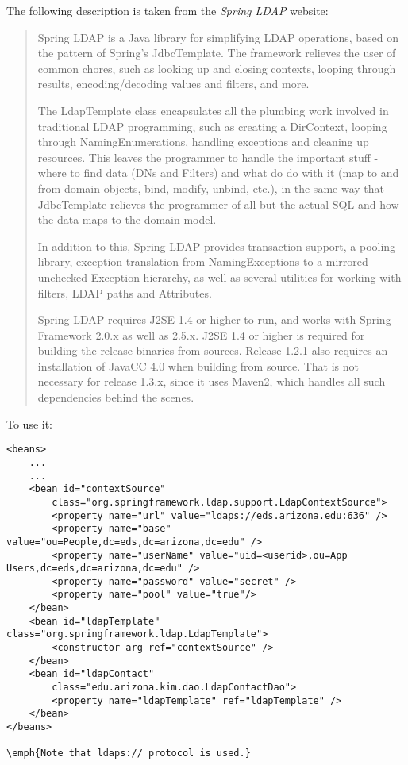 \documentclass[12pt,notitlepage]{article}
\begin{document}
The following description is taken from the \emph{Spring LDAP} website:
\begin{quote}
Spring LDAP is a Java library for simplifying LDAP operations, based on the pattern of Spring's JdbcTemplate. The framework relieves the user of common chores, such as looking up and closing contexts, looping through results, encoding/decoding values and filters, and more.

The LdapTemplate class encapsulates all the plumbing work involved in traditional LDAP programming, such as creating a DirContext, looping through NamingEnumerations, handling exceptions and cleaning up resources. This leaves the programmer to handle the important stuff - where to find data (DNs and Filters) and what do do with it (map to and from domain objects, bind, modify, unbind, etc.), in the same way that JdbcTemplate relieves the programmer of all but the actual SQL and how the data maps to the domain model.

In addition to this, Spring LDAP provides transaction support, a pooling library, exception translation from NamingExceptions to a mirrored unchecked Exception hierarchy, as well as several utilities for working with filters, LDAP paths and Attributes.

Spring LDAP requires J2SE 1.4 or higher to run, and works with Spring Framework 2.0.x as well as 2.5.x. J2SE 1.4 or higher is required for building the release binaries from sources. Release 1.2.1 also requires an installation of JavaCC 4.0 when building from source. That is not necessary for release 1.3.x, since it uses Maven2, which handles all such dependencies behind the scenes.
\end{quote}

To use it:
\begin{lstlisting}[caption=spring-datasource.xml]
<beans>
    ...
    ...
    <bean id="contextSource"
        class="org.springframework.ldap.support.LdapContextSource">
        <property name="url" value="ldaps://eds.arizona.edu:636" />
        <property name="base" value="ou=People,dc=eds,dc=arizona,dc=edu" />
        <property name="userName" value="uid=<userid>,ou=App Users,dc=eds,dc=arizona,dc=edu" />
        <property name="password" value="secret" />
        <property name="pool" value="true"/>
    </bean>
    <bean id="ldapTemplate" class="org.springframework.ldap.LdapTemplate">
        <constructor-arg ref="contextSource" />
    </bean>
    <bean id="ldapContact"
        class="edu.arizona.kim.dao.LdapContactDao">
        <property name="ldapTemplate" ref="ldapTemplate" />
    </bean>
</beans>

\emph{Note that ldaps:// protocol is used.}

\end{lstlisting}
\end{document}
